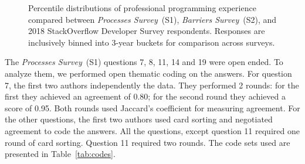 \begin{figure}[!htbp]
\centering
{}
\caption{Percentile distributions of professional programming experience compared between \textit{Processes Survey}~(S1), \textit{Barriers Survey}~(S2), and 2018 StackOverflow Developer Survey respondents. Responses are inclusively binned into 3-year buckets for comparison across surveys.}
\label{populations}
\end{figure}

The \emph{Processes Survey}~(S1) questions 7, 8, 11, 14 and 19 were open ended.
To analyze them, we performed open thematic coding on the answers.
For question 7, the first two authors independently the data.
They performed 2 rounds: for the first they achieved an agreement of 0.80; for the second round they achieved a score of 0.95.
Both rounds used Jaccard's coefficient for measuring agreement. 
For the other questions, the first two authors used card sorting and  negotiated agreement to code the answers.
All the questions, except question 11 required one round of card sorting.
Question 11 required two rounds.
The code sets used are presented in Table~\ref{tab:codes}.


